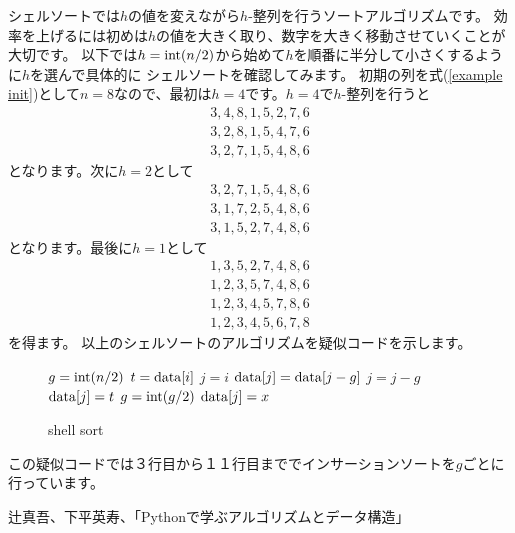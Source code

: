\documentclass[dvipdfmx]{jarticle}
\begin{document}
シェルソートでは$h$の値を変えながら$h$-整列を行うソートアルゴリズムです。
効率を上げるには初めは$h$の値を大きく取り、数字を大きく移動させていくことが大切です。
以下では$h={\rm int}(n/2)$から始めて$h$を順番に半分して小さくするように$h$を選んで具体的に
シェルソートを確認してみます。
初期の列を式(\ref{example init})として$n=8$なので、最初は$h=4$です。$h=4$で$h$-整列を行うと
\begin{eqnarray}
3, 4, 8, 1, 5, 2, 7, 6\\
3, 2, 8, 1, 5, 4, 7, 6\\
3, 2, 7, 1, 5, 4, 8, 6
\end{eqnarray}
となります。次に$h=2$として
\begin{eqnarray}
3, 2, 7, 1, 5, 4, 8, 6\\
3, 1, 7, 2, 5, 4, 8, 6\\
3, 1, 5, 2, 7, 4, 8, 6
\end{eqnarray}
となります。最後に$h=1$として
\begin{eqnarray}
1, 3, 5, 2, 7, 4, 8, 6\\
1, 2, 3, 5, 7, 4, 8, 6\\
1, 2, 3, 4, 5, 7, 8, 6\\
1, 2, 3, 4, 5, 6, 7, 8
\end{eqnarray}
を得ます。
以上のシェルソートのアルゴリズムを疑似コードを示します。
\begin{figure}[H]
\begin{algorithm}[H]
	\caption{shell sort}
	\label{shell sort}
	\begin{algorithmic}[1]
	\STATE $g={\rm int}(n/2)$  
	\STATE $t={\rm data}[i]$
	\STATE $j=i$
	\STATE ${\rm data}[j] = {\rm data}[j-g]$
	\STATE $j = j-g$
	\ENDWHILE
	\STATE ${\rm data}[j] = t$
	\ENDFOR
	\STATE $g = {\rm int}(g/2)$
	\ENDWHILE
	\STATE ${\rm data}[j] = x$
	\end{algorithmic}
\end{algorithm}
\end{figure}
この疑似コードでは３行目から１１行目まででインサーションソートを$g$ごとに行っています。

\begin{thebibliography}{9}
\item 辻真吾、下平英寿、「Pythonで学ぶアルゴリズムとデータ構造」
\end{thebibliography}
\end{document}
